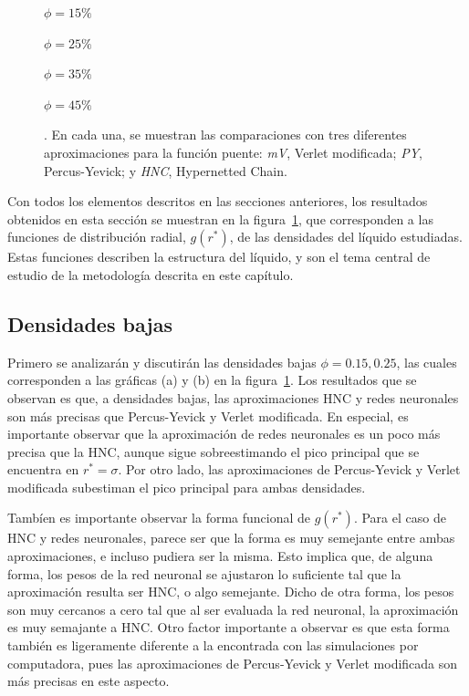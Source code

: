 \begin{figure}[p]
{    \begin{enumerate*}[label=(\alph*),itemjoin={,\enspace}]
        \item $\phi=15\%$
        \item $\phi=25\%$
        \item $\phi=35\%$
        \item $\phi=45\%$
    \end{enumerate*}
    . En cada una, se muestran las comparaciones con tres diferentes aproximaciones para la función puente: \emph{mV}, Verlet modificada; \emph{PY}, Percus-Yevick; y \emph{HNC}, Hypernetted Chain.
    }
    \label{fig:estructuras-neuronales}
\end{figure}

Con todos los elementos descritos en las secciones anteriores, los resultados obtenidos en 
esta sección se muestran en la figura~\ref{fig:estructuras-neuronales}, que corresponden
a las funciones de distribución radial, $g(r^*)$, de las densidades del líquido estudiadas.
Estas funciones describen la estructura del líquido, y son el tema central de estudio
de la metodología descrita en este capítulo.

\subsection{Densidades bajas}
Primero se analizarán y discutirán las densidades bajas $\phi=\num{0.15},\num{0.25}$,
las cuales corresponden a las gráficas (a) y (b) en la figura~\ref{fig:estructuras-neuronales}.
Los resultados que se observan es que, a densidades bajas, las aproximaciones HNC y
redes neuronales son más precisas que Percus-Yevick y Verlet modificada.
En especial, es importante observar que
la aproximación de redes neuronales es un poco más precisa que la HNC, aunque sigue 
sobreestimando el pico principal que se encuentra en $r^* = \sigma$.
Por otro lado, las aproximaciones de Percus-Yevick y Verlet modificada subestiman el pico
principal para ambas densidades.

Tambíen es importante observar la forma funcional de $g(r^*)$. Para el caso de HNC y redes 
neuronales, parece ser que la forma es muy semejante entre ambas aproximaciones, e incluso 
pudiera ser la misma. Esto implica que, de alguna forma, los pesos de la red neuronal se 
ajustaron lo suficiente tal que la aproximación resulta ser HNC, o algo semejante.
Dicho de otra forma, los pesos son muy cercanos a cero tal que al ser
evaluada la red neuronal, la aproximación es muy semajante a HNC.
Otro factor importante a observar es que esta forma también es ligeramente diferente a
la encontrada con las simulaciones por computadora, pues las aproximaciones de
Percus-Yevick y Verlet modificada son más precisas en este aspecto.
